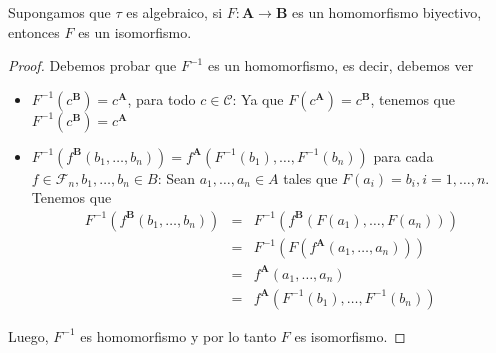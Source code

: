   \begin{lemma} \label{lemma_50}
    \PN Supongamos que $\tau$ es algebraico, si $F: \mathbf{A} \rightarrow \mathbf{B}$ es un homomorfismo biyectivo,
    entonces $F$ es un isomorfismo.
  \end{lemma}
  \begin{proof}
    \PN Debemos probar que $F^{-1}$ es un homomorfismo, es decir, debemos ver
    \begin{itemize}
      \item $F^{-1}(c^{\mathbf{B}}) = c^{\mathbf{A}}$, para todo $c \in \mathcal{C}$: Ya que $F(c^{\mathbf{A}}) =
        c^{\mathbf{B}}$, tenemos que $F^{-1}(c^{\mathbf{B}}) = c^{\mathbf{A}}$
      \item $F^{-1}(f^{\mathbf{B}}(b_{1}, \dotsc, b_{n})) = f^{\mathbf{A}}(F^{-1}(b_{1}), \dotsc, F^{-1}(b_{n}))$ para
        cada $f \in \mathcal{F}_{n}, b_{1}, \dotsc, b_{n} \in B$: Sean $a_{1}, \dotsc, a_{n} \in A$ tales que
        $F(a_{i}) = b_{i}, i = 1, \dotsc, n$. Tenemos que
        \begin{eqnarray*}
          F^{-1}(f^{\mathbf{B}}(b_{1}, \dotsc, b_{n})) &=& F^{-1}(f^{\mathbf{B}}(F(a_{1}), \dotsc, F(a_{n}))) \\
          &=& F^{-1}(F(f^{\mathbf{A}}(a_{1}, \dotsc, a_{n}))) \\
          &=& f^{\mathbf{A}}(a_{1}, \dotsc, a_{n}) \\
          &=& f^{\mathbf{A}}(F^{-1}(b_{1}), \dotsc, F^{-1}(b_{n}))
        \end{eqnarray*}
    \end{itemize}
    \PN Luego, $F^{-1}$ es homomorfismo y por lo tanto $F$ es isomorfismo.
  \end{proof}

